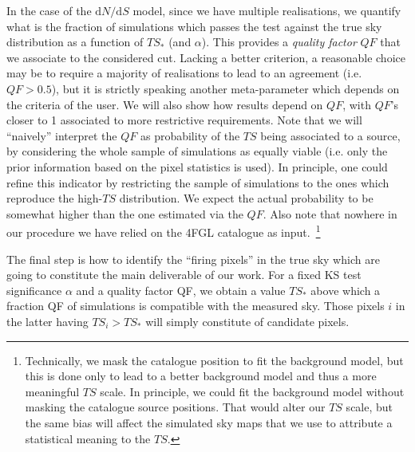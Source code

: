 \documentclass{article}
\def\dNdS{\textrm{d}N/\textrm{d}S}
\begin{document}
In the case of the $\dNdS$ model, since we have multiple realisations, we quantify what is the fraction of simulations which passes the test against the true sky distribution as a function of $TS_*$ (and $\alpha$). This provides a \textit{quality factor} $QF$ that we associate to the considered cut. Lacking a better criterion, a reasonable choice may be to require a majority of realisations to lead to an agreement (i.e. $QF>0.5$), but it is strictly speaking another meta-parameter which depends on the criteria of the user.  We will also show how results depend on $QF$, with $QF$'s closer to 1 associated to more restrictive requirements. Note that we will ``naively'' interpret the $QF$ as probability of the $TS$ being associated to a source, by considering the whole sample of simulations as equally viable (i.e. only the prior information based on the pixel statistics is used). In principle, one could refine this indicator by restricting the sample of simulations to the ones which reproduce the high-$TS$ distribution. We expect the actual probability to be somewhat higher than the one estimated via the $QF$. Also note that nowhere in our procedure we have relied on the 4FGL catalogue as input.~\footnote{Technically, we mask the catalogue position to fit the background model, but this is done only to lead to a better  background model and thus a more meaningful $TS$ scale. In principle, we could fit the background model without masking the catalogue source positions. That would alter our $TS$ scale, but the same bias will affect the simulated sky maps that we use to attribute a statistical meaning to the $TS$.}

The final step is how to identify the ``firing pixels'' in the true sky which are going to constitute the main deliverable of our work. For a fixed KS test significance $\alpha$ and a quality factor QF, we obtain a value $TS_*$ above which a fraction QF of simulations is compatible with the measured sky. Those pixels $i$ in the latter having $TS_i>TS_*$ will simply constitute of candidate pixels.
\end{document}
